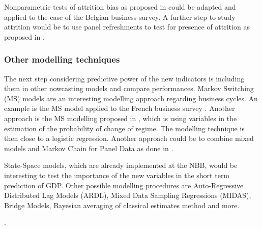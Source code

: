 \documentclass[12pt,a4paper,oneside]{book}
\begin{document}
Nonparametric tests of attrition bias as proposed in \cite{das_nonparametric_2011} could be adapted and applied to the case of the Belgian business survey.
A further step to study attrition would be to use panel refreshments to test for presence of attrition as proposed in \cite{van_landeghem_test_2014}.





\subsubsection{Other modelling techniques}

The next step considering predictive power of the new indicators is including them in other nowcasting models and compare performances. 
Markov Switching (MS) models \citep{hamilton_new_1989} are an interesting modelling approach regarding business cycles. An example is the MS model applied to the French business survey \cite{bardaji_constructing_2009}.
Another approach is the MS modelling proposed in \cite{duprey_how_2017}, which is using variables in the estimation of the probability of change of regime. The modelling technique is then close to a logistic regression. 
Another approach could be to combine mixed models and Markov Chain for Panel Data as done in \cite{de_haan-rietdijk_use_2017}.

State-Space models, which are already implemented at the NBB, would be interesting to test the importance of the new variables in the short term prediction of GDP.
Other possible modelling procedures are Auto-Regressive Distributed Lag Models (ARDL), 
Mixed Data Sampling Regressions (MIDAS), 
Bridge Models,
Bayesian averaging of classical estimates method \citep{bialowolski_bayesian_nodate}
and more.

\nocite{foroni_comparison_2014}.
\end{document}
